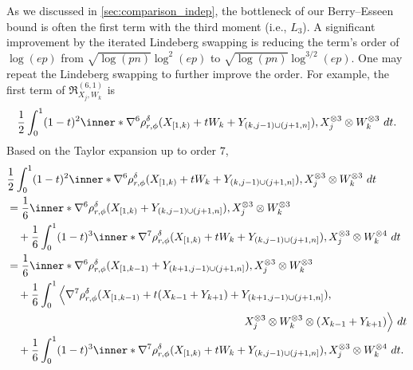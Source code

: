 \documentclass[aos]{imsart}
\begin{document}
\begin{remark}
As we discussed in \cref{sec:comparison_indep}, the bottleneck of our Berry--Esseen bound is often the first term with the third moment (i.e., $L_3$). A significant improvement by the iterated Lindeberg swapping is reducing the term's order of $\log(ep)$ from $\sqrt{\log(pn)} \log^2(ep)$ to $\sqrt{\log(pn)} \log^{3/2}(ep)$. One may repeat the Lindeberg swapping to further improve the order. For example, the first term of $\mathfrak{R}^{(6,1)}_{X_j, W_k}$ is 
\begin{equation*}
    \frac{1}{2} \int_0^1 (1-t)^2 \inner*{
        \nabla^6 \rho_{r,\phi}^\delta(X_{[1,k)} + t W_k + Y_{(k,j-1) \cup (j+1,n]}),
        X_j^{\otimes 3} \otimes W_k^{\otimes 3}
    } ~dt.
\end{equation*}
Based on the Taylor expansion up to order $7$, 
\begin{equation*}
\begin{aligned}
    & \frac{1}{2} \int_0^1 (1-t)^2 \inner*{
        \nabla^6 \rho_{r,\phi}^\delta(X_{[1,k)} + t W_k + Y_{(k,j-1) \cup (j+1,n]}),
        X_j^{\otimes 3} \otimes W_k^{\otimes 3}
    } ~dt \\
    & = \frac{1}{6} \inner*{\nabla^6 \rho_{r,\phi}^\delta(X_{[1,k)} + Y_{(k,j-1) \cup (j+1,n]}),
        X_j^{\otimes 3} \otimes W_k^{\otimes 3}
    } \\
    & \quad + \frac{1}{6} \int_0^1 (1-t)^3 \inner*{
        \nabla^7 \rho_{r,\phi}^\delta(X_{[1,k)} + t W_k + Y_{(k,j-1) \cup (j+1,n]}),
        X_j^{\otimes 3} \otimes W_k^{\otimes 4}
    } ~dt \\
    & = \frac{1}{6} \inner*{\nabla^6 \rho_{r,\phi}^\delta(X_{[1,k-1)} + Y_{(k+1,j-1) \cup (j+1,n]}),
        X_j^{\otimes 3} \otimes W_k^{\otimes 3}
    } \\
    & \quad + \frac{1}{6} \int_0^1 \Big\langle
        \nabla^7 \rho_{r,\phi}^\delta(X_{[1,k-1)} + t (X_{k-1} + Y_{k+1}) + Y_{(k+1,j-1) \cup (j+1,n]}), \\
    & \hspace{3in} X_j^{\otimes 3} \otimes W_k^{\otimes 3} \otimes (X_{k-1} + Y_{k+1})
    \Big\rangle ~dt \\
    & \quad + \frac{1}{6} \int_0^1 (1-t)^3 \inner*{
        \nabla^7 \rho_{r,\phi}^\delta(X_{[1,k)} + t W_k + Y_{(k,j-1) \cup (j+1,n]}),
        X_j^{\otimes 3} \otimes W_k^{\otimes 4}
    } ~dt. \\
\end{aligned}
\end{equation*}
\end{remark}
\end{document}
